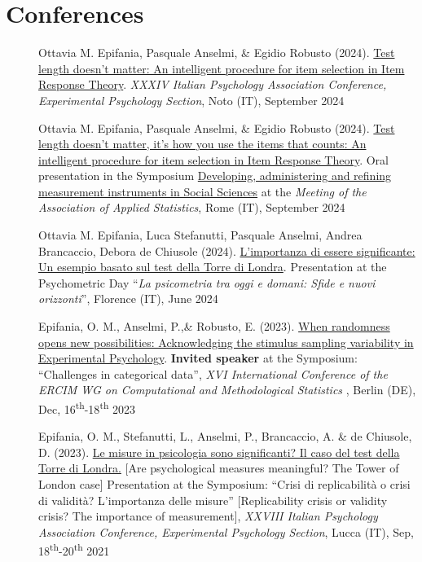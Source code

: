 \documentclass[letterpaper,12pt]{article}
\begin{document}
\section{Conferences}
\begin{description}
	
		\item[] Ottavia M. Epifania, Pasquale Anselmi, \& Egidio Robusto (2024). \href{https://ottaviae.github.io/presentations/AIP2024/ila-aip2024.pdf}{Test length doesn’t matter: An intelligent procedure for item selection in Item Response Theory}. \emph{XXXIV Italian Psychology Association Conference, Experimental Psychology Section}, Noto (IT), September 2024
	
	\item[] Ottavia M. Epifania, Pasquale Anselmi, \& Egidio Robusto (2024). \href{https://ottaviae.github.io/ASA2024/epifania/presentazione/ila-asa2024.pdf}{Test length doesn’t matter, it’s how you use the items that counts: An intelligent procedure for item selection in Item Response Theory}. Oral presentation in the Symposium \href{https://ottaviae.github.io/ASA2024/}{Developing, administering and refining measurement instruments in Social Sciences} at the \emph{Meeting of the Association of Applied Statistics}, Rome (IT), September 2024
	
		\item[] Ottavia M. Epifania, Luca Stefanutti, Pasquale Anselmi, Andrea
		Brancaccio, Debora de Chiusole (2024). \href{https://ottaviae.github.io/presentations/giornata-03/epifania-giornata-03.pdf}{L’importanza di essere significante:
			Un esempio basato sul test della Torre di Londra}. Presentation at the Psychometric Day ``\emph{La psicometria tra oggi e domani: Sfide e nuovi orizzonti}'', Florence (IT), June 2024
	
		\item[] Epifania, O. M., Anselmi, P.,\& Robusto, E. (2023). \href{https://ottaviae.github.io/presentations/Berlino2023/CMS-epifania.pdf}{When randomness opens new possibilities: Acknowledging the stimulus sampling variability in Experimental Psychology}. \textbf{Invited speaker} at the Symposium: ``Challenges in categorical data'',   \emph{XVI International Conference of the ERCIM WG on Computational and Methodological Statistics }, Berlin (DE), Dec, 16\textsuperscript{th}-18\textsuperscript{th} 2023
	
			\item[] Epifania, O. M., Stefanutti, L.,  Anselmi, P., Brancaccio, A. \& de Chiusole, D. (2023). \href{https://ottaviae.github.io/presentations/AIP2023/Simposio-validita/epifania-meaningfullness.pdf}{Le misure in psicologia sono significanti?
				Il caso del test della Torre di Londra.} [Are psychological measures meaningful? The Tower of London case] Presentation at the Symposium: ``Crisi di replicabilità o crisi di validità? L’importanza delle misure'' [Replicability crisis or validity crisis? The importance of measurement],   \emph{XXVIII Italian Psychology Association Conference, Experimental Psychology Section}, Lucca (IT), Sep, 18\textsuperscript{th}-20\textsuperscript{th} 2021
	

\end{description}
\end{document}
